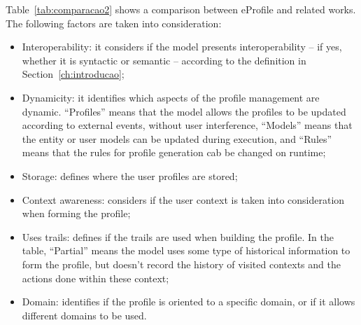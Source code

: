 \documentclass{svjour3}                     %
\begin{document}
Table~\ref{tab:comparacao2} shows a comparison between eProfile and related works. The following factors are taken into consideration:

\begin{itemize}
  \item Interoperability: it considers if the model presents interoperability -- if yes, whether it is syntactic or semantic -- according to the definition in Section~\ref{ch:introducao};
  \item Dynamicity: it identifies which aspects of the profile management are dynamic. ``Profiles'' means that the model allows the profiles to be updated according to external events, without user interference, ``Models'' means that the entity or user models can be updated during execution, and ``Rules'' means that the rules for profile generation cab be changed on runtime;
  \item Storage: defines where the user profiles are stored;
  \item Context awareness: considers if the user context is taken into consideration when forming the profile;
  \item Uses trails: defines if the trails are used when building the profile. In the table, ``Partial'' means the model uses some type of historical information to form the profile, but doesn't record the history of visited contexts and the actions done within these context;
  \item Domain: identifies if the profile is oriented to a specific domain, or if it allows different domains to be used.
\end{itemize}
\end{document}
